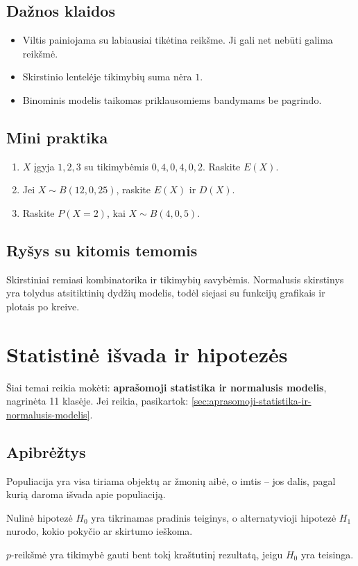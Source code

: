 \subsection{Dažnos klaidos}
\begin{itemize}
\item Viltis painiojama su labiausiai tikėtina reikšme. Ji gali net nebūti galima reikšmė.
\item Skirstinio lentelėje tikimybių suma nėra \(1\).
\item Binominis modelis taikomas priklausomiems bandymams be pagrindo.
\end{itemize}

\subsection{Mini praktika}
\begin{enumerate}[label=\alph*)]
\item \(X\) įgyja \(1,2,3\) su tikimybėmis \(0{,}4,0{,}4,0{,}2\). Raskite \(E(X)\).
\item Jei \(X\sim B(12,0{,}25)\), raskite \(E(X)\) ir \(D(X)\).
\item Raskite \(P(X=2)\), kai \(X\sim B(4,0{,}5)\).
\end{enumerate}

\subsection{Ryšys su kitomis temomis}
Skirstiniai remiasi kombinatorika ir tikimybių savybėmis. Normalusis skirstinys yra tolydus atsitiktinių dydžių modelis, todėl siejasi su funkcijų grafikais ir plotais po kreive.

\section{Statistinė išvada ir hipotezės}\label{sec:statistine-isvada-ir-hipotezes}

\begin{tcolorbox}[title=Primename iš ankstesnių klasių, colback=yellow!10]
Šiai temai reikia mokėti: \textbf{aprašomoji statistika ir normalusis modelis}, nagrinėta 11 klasėje.
Jei reikia, pasikartok: \ref{sec:aprasomoji-statistika-ir-normalusis-modelis}.
\end{tcolorbox}

\subsection{Apibrėžtys}
\begin{apibreztis}
Populiacija yra visa tiriama objektų ar žmonių aibė, o imtis -- jos dalis, pagal kurią daroma išvada apie populiaciją.
\end{apibreztis}
\begin{apibreztis}
Nulinė hipotezė \(H_0\) yra tikrinamas pradinis teiginys, o alternatyvioji hipotezė \(H_1\) nurodo, kokio pokyčio ar skirtumo ieškoma.
\end{apibreztis}
\begin{apibreztis}
\(p\)-reikšmė yra tikimybė gauti bent tokį kraštutinį rezultatą, jeigu \(H_0\) yra teisinga.
\end{apibreztis}

